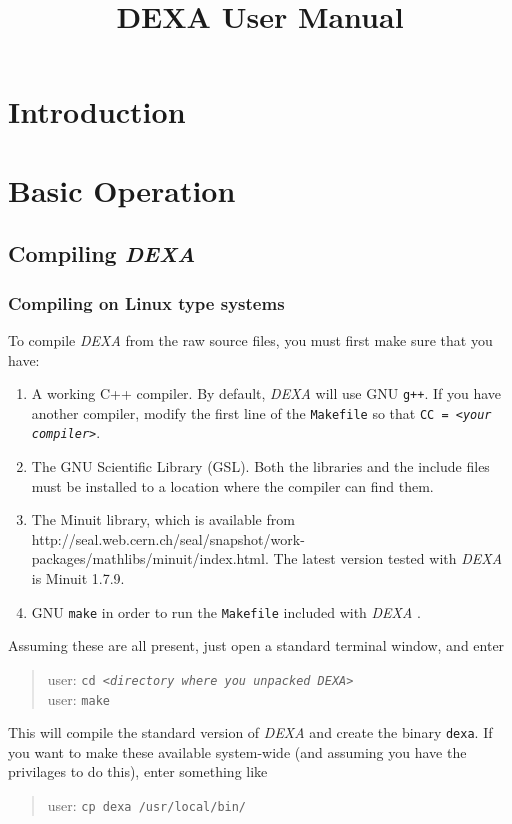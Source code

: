 \documentclass[a4paper,12pt]{report}
\title{DEXA User Manual}
\newcommand{\dexa}{\emph{DEXA} }
\begin{document}
\maketitle 
\tableofcontents
\chapter{Introduction}

\chapter{Basic Operation}
\section{Compiling \dexa}
\subsection{Compiling on Linux type systems}
To compile \dexa from the raw source files, you must first make sure that you have:

\begin{enumerate}
\item A working C++ compiler. By default, \dexa will use GNU \verb|g++|. If you have another compiler, modify the first line of the \verb|Makefile| so that \texttt{CC~=~\emph{<your compiler>}}.

\item The GNU Scientific Library (GSL). Both the libraries and the include files must be installed to a location where the compiler can find them.

\item The Minuit library, which is available from http://seal.web.cern.ch/seal/snapshot/work-packages/mathlibs/minuit/index.html. The latest version tested with \dexa is Minuit 1.7.9.

\item GNU \verb|make| in order to run the \verb|Makefile| included with \dexa.
\end{enumerate}

Assuming these are all present, just open a standard terminal window, and enter
\begin{quote}
  user\@@host: \texttt{cd \emph{<directory where you unpacked DEXA>}}\\
  user\@@host: \verb|make|
\end{quote}
This will compile the standard version of \dexa and create the binary \verb|dexa|. If you want to make these available system-wide (and assuming you have the privilages to do this), enter something like
\begin{quote}
  user\@@host: \verb|cp dexa /usr/local/bin/|
\end{quote}
\end{document}
